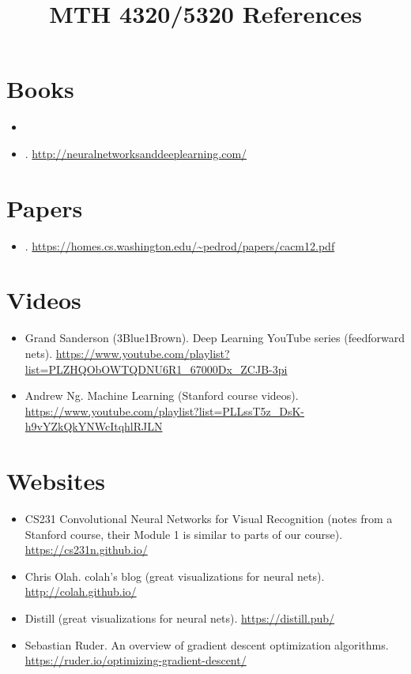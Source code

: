 \documentclass{article}
\title{MTH 4320/5320 References}
\date{}
\begin{document}
\maketitle

\vspace{-6em}

\section*{Books}

\begin{itemize}
\item {}
\item {}. \url{http://neuralnetworksanddeeplearning.com/}
\end{itemize}

\section*{Papers}

\begin{itemize}
\item {}. \url{https://homes.cs.washington.edu/~pedrod/papers/cacm12.pdf}
\end{itemize}

\section*{Videos}

\begin{itemize}
\item Grand Sanderson (3Blue1Brown). Deep Learning YouTube series (feedforward nets). \url{https://www.youtube.com/playlist?list=PLZHQObOWTQDNU6R1_67000Dx_ZCJB-3pi}

\item Andrew Ng. Machine Learning (Stanford course videos). \url{https://www.youtube.com/playlist?list=PLLssT5z_DsK-h9vYZkQkYNWcItqhlRJLN}
\end{itemize}

\section*{Websites}

\begin{itemize}
\item CS231 Convolutional Neural Networks for Visual Recognition (notes from a Stanford course, their Module 1 is similar to parts of our course). \url{https://cs231n.github.io/}

\item Chris Olah. colah's blog (great visualizations for neural nets). \url{http://colah.github.io/}

\item Distill (great visualizations for neural nets). \url{https://distill.pub/}

\item Sebastian Ruder. An overview of gradient descent optimization algorithms. \url{https://ruder.io/optimizing-gradient-descent/}
\end{itemize}


\end{document}
